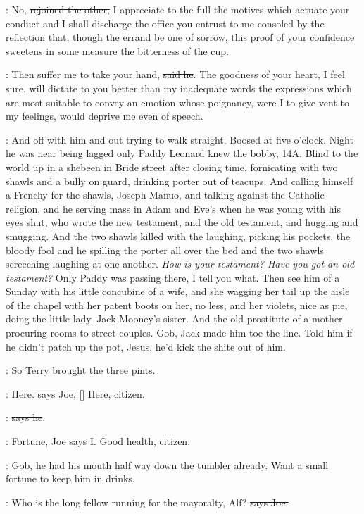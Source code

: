 \Bloom:
No, \sout{rejoined the other,}
I appreciate to the full the motives which
actuate your conduct and I shall discharge the office you entrust
to me consoled by the reflection that, though the errand be one of
sorrow, this proof of your confidence sweetens in some measure the
bitterness of the cup.

\doran:
Then suffer me to take your hand, \sout{said he}.
The goodness of your heart, I
feel sure, will dictate to you better than my inadequate words the
expressions which are most suitable to convey an emotion whose
poignancy, were I to give vent to my feelings, would deprive me even of
speech.

\Nq:
And off with him and out trying to walk straight. Boosed at five
o'clock. Night he was near being lagged only Paddy Leonard knew the bobby,
14A. Blind to the world up in a shebeen in Bride street after closing
time, fornicating with two shawls and a bully on guard, drinking porter
out of teacups. And calling himself a Frenchy for the shawls, Joseph
Manuo, and talking against the Catholic religion, and he serving mass in
Adam and Eve's when he was young with his eyes shut, who wrote the new
testament, and the old testament, and hugging and smugging. And the two
shawls killed with the laughing, picking his pockets, the bloody
fool and he spilling the porter all over the bed and the two shawls
screeching laughing at one another. \emph{How is your testament? Have you
got an old testament?} Only Paddy was passing there, I tell you what.
Then see him of a Sunday with his little concubine of a wife, and
she wagging her tail up the aisle of the chapel with her patent boots
on her, no less, and her violets, nice as pie, doing the little lady.
Jack Mooney's sister. And the old prostitute of a mother
procuring rooms to street couples. Gob, Jack made him toe the line. Told
him if he didn't patch up the pot, Jesus, he'd kick the shite out of him.

\Nq:
So Terry brought the three pints.

\joe:
Here. \sout{says Joe,}
[] Here, citizen.

\citizen:
 \sout{says he}.

:
Fortune, Joe \sout{says I}. Good health, citizen.

\Nq:
Gob, he had his mouth half way down the tumbler already. Want a
small fortune to keep him in drinks.

\joe:
Who is the long fellow running for the mayoralty,
Alf? \sout{says Joe.}

